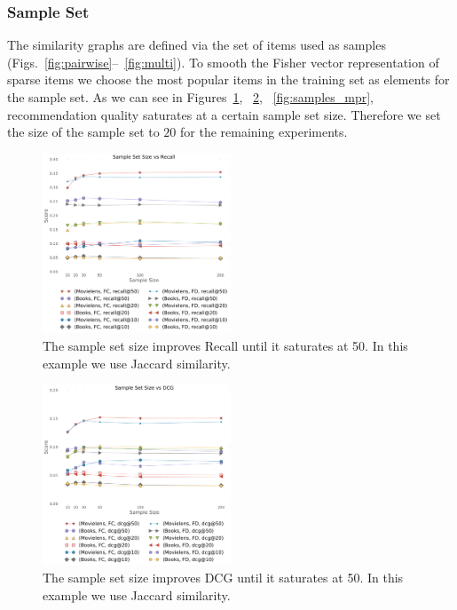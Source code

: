\subsubsection{Sample Set} 
The similarity graphs are defined via the set of items used as samples (Figs.~\ref{fig:pairwise}--~\ref{fig:multi}). To smooth the Fisher vector representation of sparse items we choose the most popular items in the training set as elements for the sample set. As we can see in Figures~\ref{fig:samples_recall}, ~\ref{fig:samples_dcg}, ~\ref{fig:samples_mpr}, recommendation quality saturates at a certain sample set size. Therefore we set the size of the sample set to $20$ for the remaining experiments. 

\begin{figure}[t]
\includegraphics[width=0.5\textwidth]{reference_size_vs_Recall.pdf}
\caption[]{The sample set size improves Recall until it saturates at 50. In this example we use Jaccard similarity.}
\label{fig:samples_recall}
\end{figure}
\begin{figure}[t]
\includegraphics[width=0.5\textwidth]{reference_size_vs_DCG.pdf}
\caption[]{The sample set size improves DCG until it saturates at 50. In this example we use Jaccard similarity.}
\label{fig:samples_dcg}
\end{figure}
